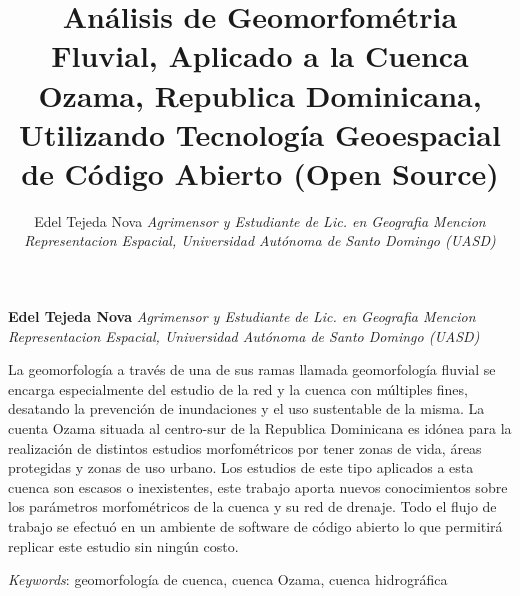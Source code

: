 \documentclass[11pt,]{article}
\title{Análisis de Geomorfométria Fluvial, Aplicado a la Cuenca Ozama,
Republica Dominicana, Utilizando Tecnología Geoespacial de Código
Abierto (Open Source)  }
\author{\Large Edel Tejeda Nova\vspace{0.05in} \newline\normalsize\emph{Agrimensor y Estudiante de Lic. en Geografia Mencion Representacion
Espacial, Universidad Autónoma de Santo Domingo (UASD)}  }
\date{}
\newcommand*{\authorfont}{\fontfamily{phv}\selectfont}
\renewenvironment{abstract}
 {{%
    \setlength{\leftmargin}{0mm}
    \setlength{\rightmargin}{\leftmargin}%
  }%
  \relax}
 {\endlist}
\begin{document}
	
%

{%
\setlength{\parindent}{0pt}
\thispagestyle{plain}
{\fontsize{18}{20}\selectfont\raggedright 
\maketitle  %

}

{
   \vskip 13.5pt\relax \normalsize\fontsize{11}{12} 
\textbf{\authorfont Edel Tejeda Nova} \hskip 15pt \emph{\small Agrimensor y Estudiante de Lic. en Geografia Mencion Representacion
Espacial, Universidad Autónoma de Santo Domingo (UASD)}   

}

}








\begin{abstract}

    \hbox{\vrule height .2pt width 39.14pc}

    \vskip 8.5pt %

\noindent La geomorfología a través de una de sus ramas llamada geomorfología
fluvial se encarga especialmente del estudio de la red y la cuenca con
múltiples fines, desatando la prevención de inundaciones y el uso
sustentable de la misma. La cuenta Ozama situada al centro-sur de la
Republica Dominicana es idónea para la realización de distintos estudios
morfométricos por tener zonas de vida, áreas protegidas y zonas de uso
urbano. Los estudios de este tipo aplicados a esta cuenca son escasos o
inexistentes, este trabajo aporta nuevos conocimientos sobre los
parámetros morfométricos de la cuenca y su red de drenaje. Todo el flujo
de trabajo se efectuó en un ambiente de software de código abierto lo
que permitirá replicar este estudio sin ningún costo.


\vskip 8.5pt \noindent \emph{Keywords}: geomorfología de cuenca, cuenca Ozama, cuenca hidrográfica \par

    \hbox{\vrule height .2pt width 39.14pc}



\end{abstract}
\end{document}
